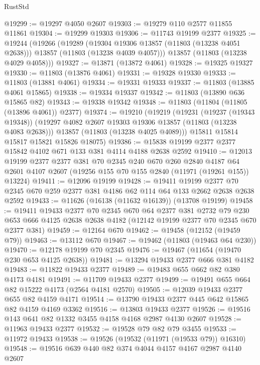\begin{lexlean}{RustStd}
\begin{coremodule}
@19299 := @19297 @4050 @2607
@19303 := @19279 @110 @2577 @11855 @11861
@19304 := @19299 @19303
@19306 := @11743 @19199 @2377
@19325 := @19244
    (@19266
      (@19289
        (@19304 @19306 @13857 (@11803 (@13238 @4051 @2638)))
        @13857
        (@11803 (@13238 @4039 @4057)))
      @13857
      (@11803 (@13238 @4029 @4058)))
@19327 := @13871 (@13872 @4061)
@19328 := @19325 @19327
@19330 := @11803 (@13876 @4061)
@19331 := @19328 @19330
@19333 := @11803 (@13881 @4061)
@19334 := @19331 @19333
@19337 := @11803 (@13885 @4061 @15865)
@19338 := @19334 @19337
@19342 := @11803 (@13890 @636 @15865 @82)
@19343 := @19338 @19342
@19348 := @11803 (@11804 (@11805 (@13896 @4061)) @2377)
@19374 := @19210
    (@19219
      (@19231
        (@19237 (@19343 @19348))
        (@19297 @4082 @2607 @19303 @19306 @13857 (@11803 (@13238 @4083 @2638)))
        @13857
        (@11803 (@13238 @4025 @4089)))
      @15811
      @15814
      @15817
      @15821
      @15826
      @18075)
@19386 := @15838 @19199 @2377 @2377 @15842 @4102 @671 @133 @381 @4114 @4188 @2638 @2592
@19410 := @12013
    @19199
    @2377
    @2377
    @381
    @70
    @2345
    @240
    @670
    @260
    @2840
    @4187
    @64
    @2601
    @4107
    @2607
    (@19256 @155 @70 @155 @2840 (@11971 (@19261 @155)) @13224)
@19411 := @12096 @19199
@19428 := @19411
    @19199
    @2377
    @70
    @2345
    @670
    @259
    @2377
    @381
    @4186
    @62
    @114
    @64
    @133
    @2662
    @2638
    @2638
    @2592
@19433 := @11626 (@16138 (@11632 @16139)) (@13708 @19199)
@19458 := @19411
    @19433
    @2377
    @70
    @2345
    @670
    @64
    @2377
    @381
    @2732
    @79
    @230
    @653
    @666
    @4125
    @2638
    @2638
    @4182
    (@12142 @19199 @2377 @70 @2345 @670 @2377 @381)
@19459 := @12164 @670
@19462 := @19458 (@12152 (@19459 @79))
@19463 := @13112 @670
@19467 := @19462 (@11803 (@19463 @64 @230))
@19470 := @12178 @19199 @70 @2345
@19476 := @19467 (@11654 (@19470 @230 @653 @4125 @2638))
@19481 := @13294 @19433 @2377 @666 @381 @4182
@19483 := @11822 @19433 @2377
@19489 := @19483 @655 @662 @82 @380 @4173 @4181
@19491 := @11709 @19433 @2377
@19499 := @19491 @655 @664 @82 @15222 @4173 (@2564 @4181 @2570)
@19505 := @12039 @19433 @2377 @655 @82 @4159 @4171
@19514 := @13790 @19433 @2377 @445 @642 @15865 @82 @4159 @4169 @3362
@19516 := @13803 @19433 @2377
@19526 := @19516 @143 @641 @82 @1332 @3455 @4158 @4168 @2987 @4130 @2607
@19528 := @11963 @19433 @2377
@19532 := @19528 @79 @82 @79 @3455
@19533 := @11972 @19433
@19538 := @19526 (@19532 (@11971 (@19533 @79)) @16310)
@19548 := @19516 @639 @440 @82 @374 @4044 @4157 @4167 @2987 @4140 @2607

\end{coremodule}
\end{lexlean}
